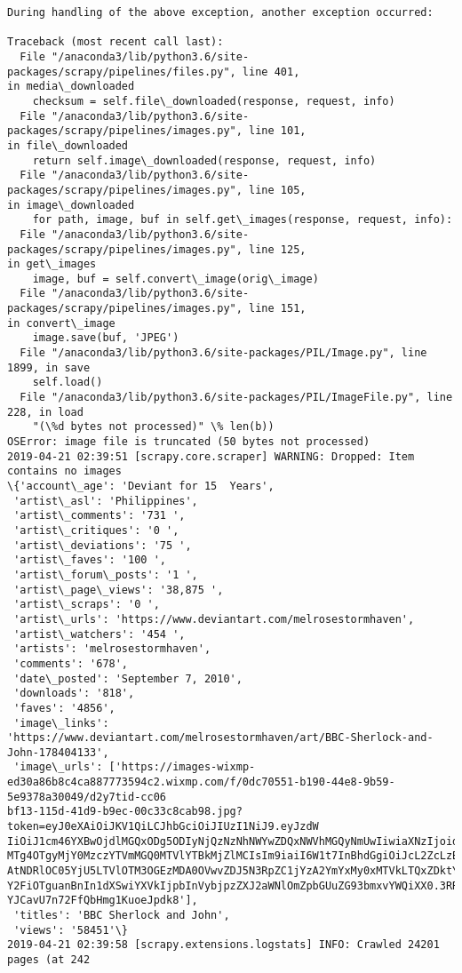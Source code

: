 \documentclass[11pt]{article}
\begin{document}
\begin{Verbatim}[commandchars=\\\{\},fontsize=\footnotesize]
During handling of the above exception, another exception occurred:

Traceback (most recent call last):
  File "/anaconda3/lib/python3.6/site-packages/scrapy/pipelines/files.py", line 401,
in media\_downloaded
    checksum = self.file\_downloaded(response, request, info)
  File "/anaconda3/lib/python3.6/site-packages/scrapy/pipelines/images.py", line 101,
in file\_downloaded
    return self.image\_downloaded(response, request, info)
  File "/anaconda3/lib/python3.6/site-packages/scrapy/pipelines/images.py", line 105,
in image\_downloaded
    for path, image, buf in self.get\_images(response, request, info):
  File "/anaconda3/lib/python3.6/site-packages/scrapy/pipelines/images.py", line 125,
in get\_images
    image, buf = self.convert\_image(orig\_image)
  File "/anaconda3/lib/python3.6/site-packages/scrapy/pipelines/images.py", line 151,
in convert\_image
    image.save(buf, 'JPEG')
  File "/anaconda3/lib/python3.6/site-packages/PIL/Image.py", line 1899, in save
    self.load()
  File "/anaconda3/lib/python3.6/site-packages/PIL/ImageFile.py", line 228, in load
    "(\%d bytes not processed)" \% len(b))
OSError: image file is truncated (50 bytes not processed)
2019-04-21 02:39:51 [scrapy.core.scraper] WARNING: Dropped: Item contains no images
\{'account\_age': 'Deviant for 15  Years',
 'artist\_asl': 'Philippines',
 'artist\_comments': '731 ',
 'artist\_critiques': '0 ',
 'artist\_deviations': '75 ',
 'artist\_faves': '100 ',
 'artist\_forum\_posts': '1 ',
 'artist\_page\_views': '38,875 ',
 'artist\_scraps': '0 ',
 'artist\_urls': 'https://www.deviantart.com/melrosestormhaven',
 'artist\_watchers': '454 ',
 'artists': 'melrosestormhaven',
 'comments': '678',
 'date\_posted': 'September 7, 2010',
 'downloads': '818',
 'faves': '4856',
 'image\_links': 'https://www.deviantart.com/melrosestormhaven/art/BBC-Sherlock-and-
John-178404133',
 'image\_urls': ['https://images-wixmp-
ed30a86b8c4ca887773594c2.wixmp.com/f/0dc70551-b190-44e8-9b59-5e9378a30049/d2y7tid-cc06
bf13-115d-41d9-b9ec-00c33c8cab98.jpg?token=eyJ0eXAiOiJKV1QiLCJhbGciOiJIUzI1NiJ9.eyJzdW
IiOiJ1cm46YXBwOjdlMGQxODg5ODIyNjQzNzNhNWYwZDQxNWVhMGQyNmUwIiwiaXNzIjoidXJuOmFwcDo3ZTBk
MTg4OTgyMjY0MzczYTVmMGQ0MTVlYTBkMjZlMCIsIm9iaiI6W1t7InBhdGgiOiJcL2ZcLzBkYzcwNTUxLWIxOT
AtNDRlOC05YjU5LTVlOTM3OGEzMDA0OVwvZDJ5N3RpZC1jYzA2YmYxMy0xMTVkLTQxZDktYjllYy0wMGMzM2M4
Y2FiOTguanBnIn1dXSwiYXVkIjpbInVybjpzZXJ2aWNlOmZpbGUuZG93bmxvYWQiXX0.3RRjMd6\_q6cBQZh-
YJCavU7n72FfQbHmg1KuoeJpdk8'],
 'titles': 'BBC Sherlock and John',
 'views': '58451'\}
2019-04-21 02:39:58 [scrapy.extensions.logstats] INFO: Crawled 24201 pages (at 242

\end{Verbatim}
\end{document}
